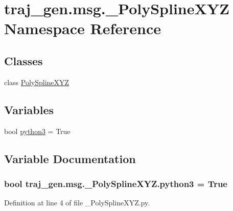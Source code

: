\hypertarget{namespacetraj__gen_1_1msg_1_1___poly_spline_x_y_z}{}\section{traj\+\_\+gen.\+msg.\+\_\+\+Poly\+Spline\+X\+YZ Namespace Reference}
\label{namespacetraj__gen_1_1msg_1_1___poly_spline_x_y_z}
\subsection*{Classes}
\begin{DoxyCompactItemize}
\item 
class \hyperlink{classtraj__gen_1_1msg_1_1___poly_spline_x_y_z_1_1_poly_spline_x_y_z}{Poly\+Spline\+X\+YZ}
\end{DoxyCompactItemize}
\subsection*{Variables}
\begin{DoxyCompactItemize}
\item 
bool \hyperlink{namespacetraj__gen_1_1msg_1_1___poly_spline_x_y_z_acba6768869ec464182f66f04ad421acd}{python3} = True
\end{DoxyCompactItemize}


\subsection{Variable Documentation}
\subsubsection[{\texorpdfstring{python3}{python3}}]{\setlength{\rightskip}{0pt plus 5cm}bool traj\+\_\+gen.\+msg.\+\_\+\+Poly\+Spline\+X\+Y\+Z.\+python3 = True}\hypertarget{namespacetraj__gen_1_1msg_1_1___poly_spline_x_y_z_acba6768869ec464182f66f04ad421acd}{}\label{namespacetraj__gen_1_1msg_1_1___poly_spline_x_y_z_acba6768869ec464182f66f04ad421acd}


Definition at line 4 of file \+\_\+\+Poly\+Spline\+X\+Y\+Z.\+py.

